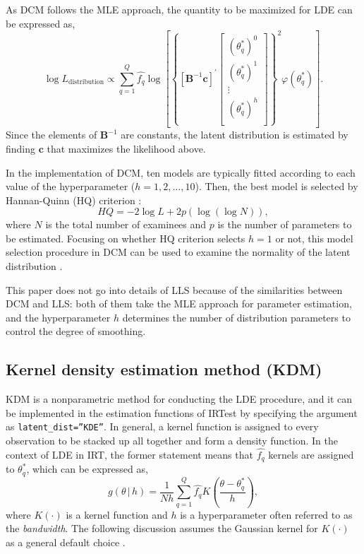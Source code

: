 As DCM follows the MLE approach, the quantity to be maximized for LDE
can be expressed as, \[\log{L_{\text{distribution}}} \propto
\sum_{q = 1}^{Q}{
\hat{f_{q}}
\log\left[
\left\{
\left[ \mathrm{\mathbf{B}}^{-1} \mathrm{\mathbf{c}} \right]^{'}
\begin{bmatrix}
\left( \theta_{q}^{*} \right)^{0} \\
\left( \theta_{q}^{*} \right)^{1} \\
\vdots \\
\left( \theta_{q}^{*} \right)^{h} \\
\end{bmatrix}
\right\}^{2}
\varphi{\left( \theta_{q}^{*} \right)}
\right]
}.
\label{eq:dcmlikeli}\] Since the elements of \(\mathrm{\mathbf{B}}^{-1}\)
are constants, the latent distribution is estimated by finding
\(\mathrm{\mathbf{c}}\) that maximizes the likelihood above.

In the implementation of DCM, ten models are typically fitted according
to each value of the hyperparameter (\(h = 1, 2, \dots, 10\)). Then, the
best model is selected by Hannan-Quinn (HQ) criterion
\citep{Hannan+Quinn:1979}:
\[HQ = -2 \log{L} + 2 p \left( \log{(\log{N})} \right),
\label{eq:hq}\] where \(N\) is the total number of examinees and \(p\) is
the number of parameters to be estimated. Focusing on whether HQ
criterion selects \(h = 1\) or not, this model selection procedure in DCM
can be used to examine the normality of the latent distribution
\citep{Woods+Lin:2009}.

This paper does not go into details of LLS
\citep{Casabianca+Lewis:2015, Xu+vonDavier:2008} because of the similarities
between DCM and LLS: both of them take the MLE approach for parameter
estimation, and the hyperparameter \(h\) determines the number of
distribution parameters to control the degree of smoothing.

\hypertarget{kernel-density-estimation-method-kdm}{%
\subsection{Kernel density estimation method (KDM)}\label{kernel-density-estimation-method-kdm}}

KDM is a nonparametric method for conducting the LDE procedure, and it
can be implemented in the estimation functions of IRTest by specifying
the argument as \texttt{latent\_dist=”KDE”}. In general, a kernel function is
assigned to every observation to be stacked up all together and form a
density function. In the context of LDE in IRT, the former statement
means that \(\hat{f_{q}}\) kernels are assigned to \(\theta_{q}^{*}\), which
can be expressed as, \[g{\left( \theta \, | \, h \right)} =
\frac{1}{Nh} \sum_{q = 1}^{Q}{\hat{f_q} K{\left( \frac{\theta - \theta_{q}^{*}}{h} \right)}} ,
\label{eq:kdm}\] where \(K{( \cdot )}\) is a kernel function and \(h\) is a
hyperparameter often referred to as the \emph{bandwidth}. The following
discussion assumes the Gaussian kernel for \(K{( \cdot )}\) as a general
default choice \citep{Gramacki:2018, Silverman:1986}.

